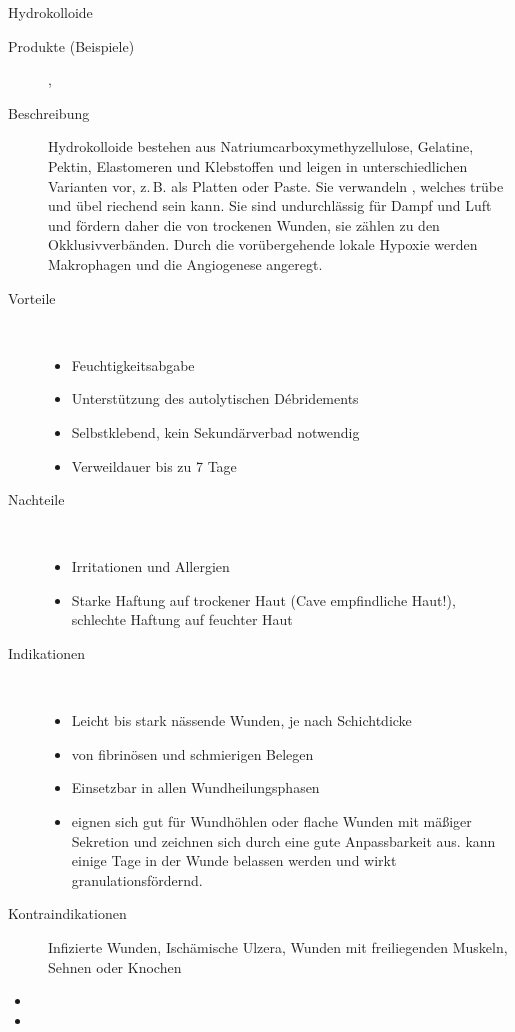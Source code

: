 \TextSlide
{Hydrokolloide}
{
\begin{description}
  \item[Produkte (Beispiele)] ,
  \item[Beschreibung] Hydrokolloide bestehen aus
  Natriumcarboxymethyzellulose, Gelatine, Pektin, Elastomeren und Klebstoffen und
  leigen in unterschiedlichen Varianten vor, z.\,B. als
  Platten oder Paste.
  Sie verwandeln , welches
  trübe und übel riechend sein kann. Sie sind undurchlässig für
  Dampf und Luft und fördern daher die  von
  trockenen Wunden, sie zählen zu den Okklusivverbänden. Durch
  die vorübergehende lokale Hypoxie werden Makrophagen und die
  Angiogenese angeregt. 
  \item[Vorteile] ~
  \begin{itemize}
    \item[$+$] Feuchtigkeitsabgabe
    \item[$+$] Unterstützung des autolytischen Débridements
    \item[$+$] Selbstklebend, kein Sekundärverbad notwendig
    \item[$+$] Verweildauer bis zu 7 Tage
  \end{itemize}
  \item[Nachteile] ~
  \begin{itemize}
    \item[$-$] Irritationen und Allergien
    \item[$-$] Starke Haftung auf trockener Haut (Cave
    empfindliche Haut!), schlechte Haftung auf feuchter Haut
  \end{itemize}
  \item[Indikationen] ~
  \begin{itemize}
    \item Leicht bis stark nässende Wunden, je nach
    Schichtdicke
    \item {} von fibrinösen und schmierigen
    Belegen
    \item Einsetzbar in allen Wundheilungsphasen
    \item {} eignen sich gut
  für Wundhöhlen oder flache Wunden mit mäßiger Sekretion und zeichnen  sich durch
  eine gute Anpassbarkeit aus. 
  kann einige Tage in der Wunde belassen werden und wirkt
  granulationsfördernd. 
  \end{itemize}
  \item[Kontraindikationen] Infizierte Wunden, Ischämische
  Ulzera, Wunden mit freiliegenden Muskeln, Sehnen oder
  Knochen
\end{description}
}
{
\begin{itemize}
  \item {}
  \item 
\end{itemize}
}
{}{}{}

